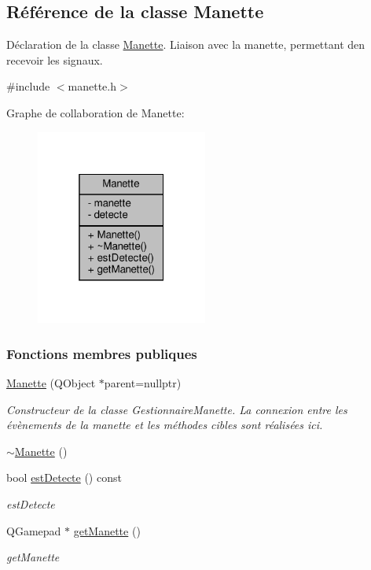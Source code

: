 \hypertarget{class_manette}{}\subsection{Référence de la classe Manette}
\label{class_manette}


Déclaration de la classe \hyperlink{class_manette}{Manette}. Liaison avec la manette, permettant d\textquotesingle{}en recevoir les signaux.  




{\ttfamily \#include $<$manette.\+h$>$}



Graphe de collaboration de Manette\+:
\nopagebreak
\begin{figure}[H]
\begin{center}
\leavevmode
\includegraphics[width=160pt]{class_manette__coll__graph}
\end{center}
\end{figure}
\subsubsection*{Fonctions membres publiques}
\begin{DoxyCompactItemize}
\item 
\hyperlink{class_manette_a9a7b00a30cd6a7eea503c8bcfe5bbcbb}{Manette} (Q\+Object $\ast$parent=nullptr)
\begin{DoxyCompactList}\small\item\em Constructeur de la classe Gestionnaire\+Manette. La connexion entre les évènements de la manette et les méthodes cibles sont réalisées ici. \end{DoxyCompactList}\item 
\hyperlink{class_manette_a86a0cab49599b27d86c2e77f13fa54a2}{$\sim$\+Manette} ()
\item 
bool \hyperlink{class_manette_a035c0a43a11e91889891b3c874f0a58d}{est\+Detecte} () const
\begin{DoxyCompactList}\small\item\em est\+Detecte \end{DoxyCompactList}\item 
Q\+Gamepad $\ast$ \hyperlink{class_manette_a708eccb66e967e0fe575b19e9899ff5a}{get\+Manette} ()
\begin{DoxyCompactList}\small\item\em get\+Manette \end{DoxyCompactList}\end{DoxyCompactItemize}
